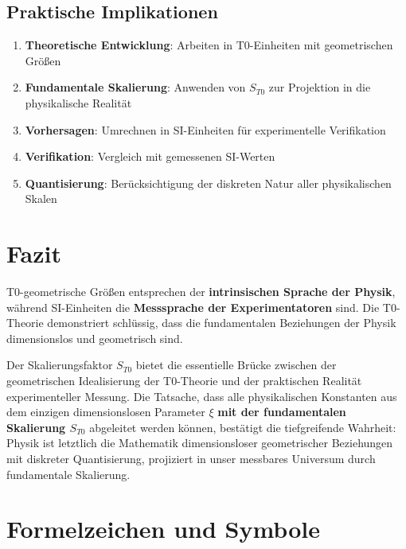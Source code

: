 	\subsection{Praktische Implikationen}
	\begin{enumerate}
		\item \textbf{Theoretische Entwicklung}: Arbeiten in T0-Einheiten mit geometrischen Größen
		\item \textbf{Fundamentale Skalierung}: Anwenden von $S_{T0}$ zur Projektion in die physikalische Realität
		\item \textbf{Vorhersagen}: Umrechnen in SI-Einheiten für experimentelle Verifikation
		\item \textbf{Verifikation}: Vergleich mit gemessenen SI-Werten
		\item \textbf{Quantisierung}: Berücksichtigung der diskreten Natur aller physikalischen Skalen
	\end{enumerate}
	
	\section{Fazit}
	
	T0-geometrische Größen entsprechen der \textbf{intrinsischen Sprache der Physik}, während SI-Einheiten die \textbf{Messsprache der Experimentatoren} sind. Die T0-Theorie demonstriert schlüssig, dass die fundamentalen Beziehungen der Physik dimensionslos und geometrisch sind.
	
	Der Skalierungsfaktor $S_{T0}$ bietet die essentielle Brücke zwischen der geometrischen Idealisierung der T0-Theorie und der praktischen Realität experimenteller Messung. Die Tatsache, dass alle physikalischen Konstanten aus dem einzigen dimensionslosen Parameter $\xi$ \textbf{mit der fundamentalen Skalierung $S_{T0}$} abgeleitet werden können, bestätigt die tiefgreifende Wahrheit: Physik ist letztlich die Mathematik dimensionsloser geometrischer Beziehungen mit diskreter Quantisierung, projiziert in unser messbares Universum durch fundamentale Skalierung.
	
	\appendix
	\section{Formelzeichen und Symbole}
	
